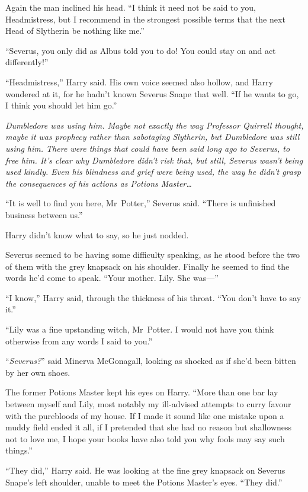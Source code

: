 Again the man inclined his head. “I think it need not be said to you, Headmistress, but I recommend in the strongest possible terms that the next Head of Slytherin be nothing like me.”

“Severus, you only did as Albus told you to do! You could stay on and act differently!”

“Headmistress,” Harry said. His own voice seemed also hollow, and Harry wondered at it, for he hadn’t known Severus Snape that well. “If he wants to go, I think you should let him go.”

\emph{Dumbledore was using him. Maybe not exactly the way Professor Quirrell thought, maybe it was prophecy rather than sabotaging Slytherin, but Dumbledore was still using him. There were things that could have been said long ago to Severus, to free him. It’s clear why Dumbledore didn’t risk that, but still, Severus wasn’t being used kindly. Even his blindness and grief were being used, the way he didn’t grasp the consequences of his actions as Potions Master…}

“It is well to find you here, Mr~Potter,” Severus said. “There is unfinished business between us.”

Harry didn’t know what to say, so he just nodded.

Severus seemed to be having some difficulty speaking, as he stood before the two of them with the grey knapsack on his shoulder. Finally he seemed to find the words he’d come to speak. “Your mother. Lily. She was—”

“I know,” Harry said, through the thickness of his throat. “You don’t have to say it.”

“Lily was a fine upstanding witch, Mr~Potter. I would not have you think otherwise from any words I said to you.”

“\emph{Severus?}” said Minerva McGonagall, looking as shocked as if she’d been bitten by her own shoes.

The former Potions Master kept his eyes on Harry. “More than one bar lay between myself and Lily, most notably my ill-advised attempts to curry favour with the purebloods of my house. If I made it sound like one mistake upon a muddy field ended it all, if I pretended that she had no reason but shallowness not to love me, I hope your books have also told you why fools may say such things.”

“They did,” Harry said. He was looking at the fine grey knapsack on Severus Snape’s left shoulder, unable to meet the Potions Master’s eyes. “They did.”

